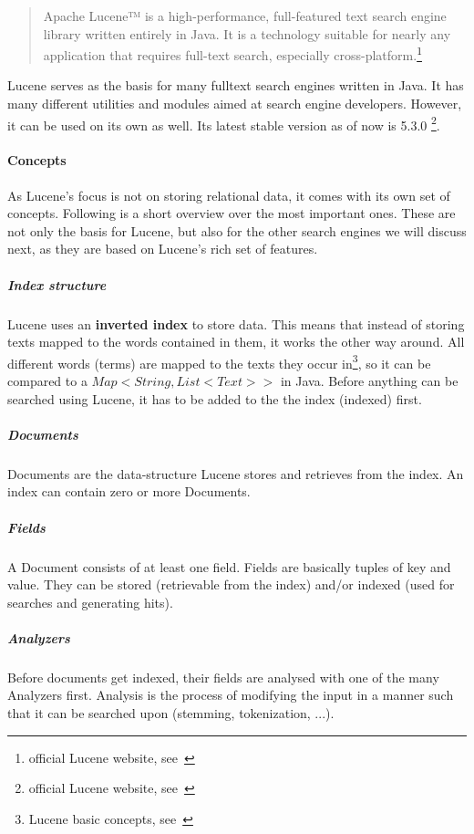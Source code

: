 \begin{quote}
	Apache Lucene™ is a high-performance, full-featured text search engine library written entirely in Java. It is a technology suitable for nearly any application that requires full-text search, especially cross-platform.\footnote{official Lucene website, see~\cite{lucene_apache_org}}
\end{quote}
Lucene serves as the basis for many fulltext search engines written in Java. It has many different utilities and modules aimed at search engine developers. However, it can be used on its own as well. Its latest stable version as of now is 5.3.0 \footnote{official Lucene website, see~\cite{lucene_apache_org}}.

\paragraph{Concepts}

As Lucene's focus is not on storing relational data, it comes with its own set of concepts. Following is a short overview over the most important ones. These are not only the basis for Lucene, but also for the other search engines we will discuss next, as they are based on Lucene's rich set of features.

\subparagraph{Index structure}
Lucene uses an \textbf{inverted index} to store data. This means that instead of storing texts mapped to the words contained in them, it works the other way around. All different words (terms) are mapped to the texts they occur in\footnote{Lucene basic concepts, see~\cite{lucene_basic_concepts}}, so it can be compared to a \(Map<String, List<Text>>\) in Java. Before anything can be searched using Lucene, it has to be added to the the index (indexed) first.

\subparagraph{Documents}
Documents are the data-structure Lucene stores and retrieves from the index. An index can contain zero or more Documents.

\subparagraph{Fields}
A Document consists of at least one field. Fields are basically tuples of key and value. They can be stored (retrievable from the index) and/or indexed (used for searches and generating hits).

\subparagraph{Analyzers}
Before documents get indexed, their fields are analysed with one of the many Analyzers first. Analysis is the process of modifying the input in a manner such that it can be searched upon (stemming, tokenization, ...).

\pagebreak

